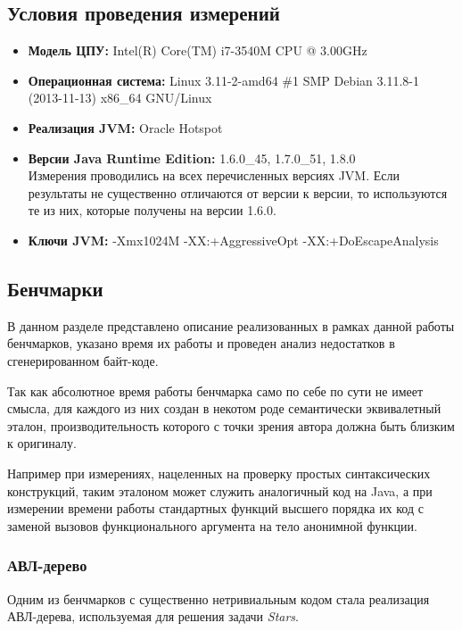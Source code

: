 \subsection{Условия проведения измерений}
\begin{itemize}
    \item \textbf{Модель ЦПУ:} Intel(R) Core(TM) i7-3540M CPU @ 3.00GHz
    \item \textbf{Операционная система:} Linux 3.11-2-amd64 \#1 SMP Debian 3.11.8-1 (2013-11-13) x86\_64 GNU/Linux
    \item \textbf{Реализация JVM:} Oracle Hotspot
    \item \textbf{Версии Java Runtime Edition:} 1.6.0\_45, 1.7.0\_51, 1.8.0 \\
    Измерения проводились на всех перечисленных версиях JVM.
    Если результаты не существенно отличаются от версии к версии, то используются те из них,
    которые получены на версии 1.6.0.
    \item \textbf{Ключи JVM:} -Xmx1024M -XX:+AggressiveOpt -XX:+DoEscapeAnalysis
\end{itemize}

\subsection{Бенчмарки}
\label{section:benchmarks}
В данном разделе представлено описание реализованных в рамках данной работы бенчмарков, указано
время их работы и проведен анализ недостатков в сгенерированном байт-коде.

Так как абсолютное время работы бенчмарка само по себе по сути не имеет смысла, для каждого из
них создан в некотом роде семантически эквивалетный эталон, производительность которого
с точки зрения автора должна быть близким к оригиналу.

Например при измерениях, нацеленных на проверку простых синтаксических конструкций, таким эталоном
может служить аналогичный код на Java, а при измерении времени работы стандартных функций высшего
порядка их код с заменой вызовов функционального аргумента на тело анонимной функции.

\subsubsection{АВЛ-дерево}
\label{section:avl:bm}
Одним из бенчмарков с существенно нетривиальным кодом стала реализация АВЛ-дерева, используемая
для решения задачи \textit{Stars}.

